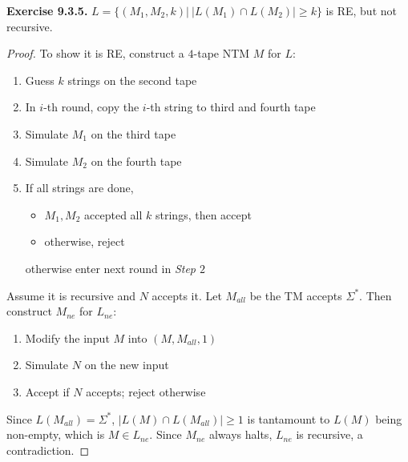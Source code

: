 \documentclass[a4paper]{article}
\newtheorem*{proof}{Proof}
\newenvironment{exercise}[1]{
	\par
	\noindent\textbf{Exercise #1.}\quad
}{
	\par
	\bigskip
}
\begin{document}
\begin{exercise}{9.3.5} $L=\big\{(M_1,M_2,k)\big|\ |L(M_1)\cap L(M_2)|\geqslant k\big\}$ is RE, but not recursive.
    \begin{proof}
        To show it is RE, construct a $4$-tape NTM $M$ for $L$:
        \begin{enumerate}
            \item Guess $k$ strings on the second tape
            \item In $i$-th round, copy the $i$-th string to third and fourth tape
            \item Simulate $M_1$ on the third tape
            \item Simulate $M_2$ on the fourth tape
            \item If all strings are done,
                \begin{itemize}
                    \item $M_1,M_2$ accepted all $k$ strings, then accept
                    \item otherwise, reject
                \end{itemize}
                otherwise enter next round in \textit{Step $2$}
        \end{enumerate}
        Assume it is recursive and $N$ accepts it.
        Let $M_{all}$ be the TM accepts $\Sigma^*$. Then construct $M_{ne}$ for $L_{ne}$:
        \begin{enumerate}
            \item Modify the input $M$ into $(M,M_{all},1)$
            \item Simulate $N$ on the new input
            \item Accept if $N$ accepts; reject otherwise
        \end{enumerate}
        Since $L(M_{all})=\Sigma^*$, $|L(M)\cap L(M_{all})|\geqslant 1$ is tantamount to $L(M)$ being non-empty,
        which is $M\in L_{ne}$. Since $M_{ne}$ always halts, $L_{ne}$ is recursive, a contradiction.
    \end{proof}
\end{exercise}
\end{document}
